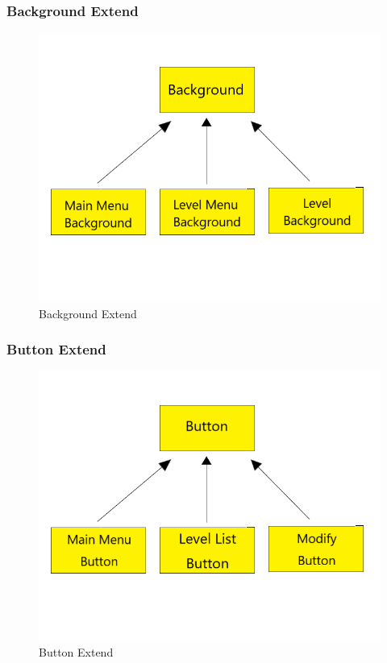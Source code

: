 \subsubsection{Background Extend}
\begin{figure}[H]
\graphicspath{{pic/}}
\includegraphics[scale=0.5]{bg.png}
\caption{Background Extend}
\vskip 0pt
\end{figure}

\subsubsection{Button Extend}

\begin{figure}[H]
\graphicspath{{pic/}}
\includegraphics[scale=0.5]{button.png}
\caption{Button Extend}
\vskip 0pt
\end{figure}